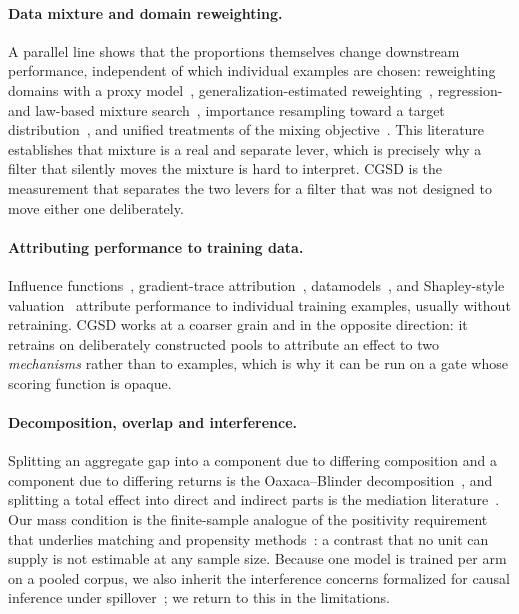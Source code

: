 \documentclass[10pt,twocolumn]{article}
\begin{document}
\paragraph{Data mixture and domain reweighting.}
A parallel line shows that the proportions themselves change downstream performance, independent
of which individual examples are chosen: reweighting domains with a proxy
model~\citep{xie2023doremi}, generalization-estimated reweighting~\citep{fan2024doge},
regression- and law-based mixture search~\citep{liu2024regmix,ye2024datamixinglaws}, importance
resampling toward a target distribution~\citep{xie2023dsir}, and unified treatments of the mixing
objective~\citep{chen2024aioli}. This literature establishes that mixture is a real and separate
lever, which is precisely why a filter that silently moves the mixture is hard to interpret.
CGSD is the measurement that separates the two levers for a filter that was not designed to move
either one deliberately.

\paragraph{Attributing performance to training data.}
Influence functions~\citep{koh2017influence,grosse2023studying}, gradient-trace
attribution~\citep{pruthi2020tracin}, datamodels~\citep{ilyas2022datamodels}, and Shapley-style
valuation~\citep{ghorbani2019datashapley,wang2025inrunshapley} attribute performance to
individual training examples, usually without retraining. CGSD works at a coarser grain and in
the opposite direction: it retrains on deliberately constructed pools to attribute an effect to
two \emph{mechanisms} rather than to examples, which is why it can be run on a gate whose scoring
function is opaque.

\paragraph{Decomposition, overlap and interference.}
Splitting an aggregate gap into a component due to differing composition and a component due to
differing returns is the Oaxaca--Blinder decomposition~\citep{oaxaca1973male,blinder1973wage},
and splitting a total effect into direct and indirect parts is the mediation
literature~\citep{pearl2001direct}. Our mass condition is the finite-sample analogue of the
positivity requirement that underlies matching and propensity
methods~\citep{rosenbaum1983propensity,stuart2010matching}: a contrast that no unit can supply is
not estimable at any sample size. Because one model is trained per arm on a pooled corpus, we
also inherit the interference concerns formalized for causal inference under
spillover~\citep{hudgens2008toward}; we return to this in the limitations.
\end{document}
